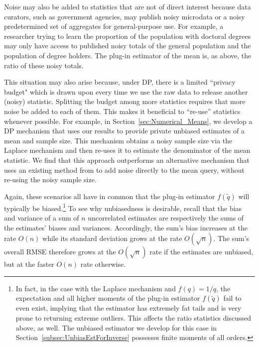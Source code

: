 \documentclass[11pt]{article}
\begin{document}
Noise may also be added to statistics that are not of direct interest because data curators, such as government agencies, may publish noisy microdata or a noisy predetermined set of aggregates for general-purpose use. For example, a researcher trying to learn the proportion of the population with doctoral degrees may only have access to published noisy totals of the general population and the population of degree holders. The plug-in estimator of the mean is, as above, the ratio of these noisy totals.
    
This situation may also arise because, under DP, there is a limited ``privacy budget" which is drawn upon every time we use the raw data to release another (noisy) statistic. Splitting the budget among more statistics requires that more noise be added to each of them. This makes it beneficial to ``re-use'' statistics whenever possible. For example, in Section~\ref{sec:Numerical_Means}, we develop a DP mechanism that uses our results to provide private unbiased estimates of a mean and sample size. This mechanism obtains a noisy sample size via the Laplace mechanism and then re-uses it to estimate the denominator of the mean statistic. We find that this approach outperforms an alternative mechanism that uses an existing method from \cite{KamathEtAl2023Trilemma} to add noise directly to the mean query, without re-using the noisy sample size.

Again, these scenarios all have in common that the plug-in estimator $f(\tilde{q})$ will typically be biased.\footnote{In fact, in the case with the Laplace mechanism and $f(q)=1/q$, the expectation and all higher moments of the plug-in estimator $f(\tilde{q})$ fail to even exist, implying that the estimator has extremely fat tails and is very prone to returning extreme outliers. This affects the ratio statistics discussed above, as well. The unbiased estimator we develop for this case in Section~\ref{subsec:UnbiasEstForInverse} possesses finite moments of all orders.} To see why unbiasedness is desirable, recall that the bias and variance of a sum of $n$ uncorrelated estimates are respectively the sums of the estimates' biases and variances. Accordingly, the sum's bias increases at the rate $O(n)$ while its standard deviation grows at the rate $O(\sqrt{n})$. The sum's overall RMSE therefore grows at the $O(\sqrt{n})$ rate if the estimates are unbiased, but at the faster $O(n)$ rate otherwise.
\end{document}
